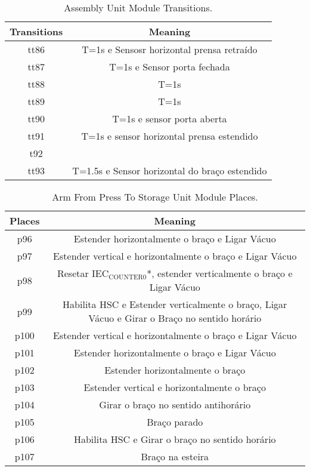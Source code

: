 \begin{table}[htbp]
\caption{Assembly Unit Module Transitions.}
\centering
\begin{tabular}{cc}
Transitions & Meaning\\
\hline
tt86 & T=1s e Sensosr horizontal prensa retraído\\
tt87 & T=1s e Sensor porta fechada\\
tt88 & T=1s\\
tt89 & T=1s\\
tt90 & T=1s e sensor porta aberta\\
tt91 & T=1s e sensor horizontal prensa estendido\\
t92 & \\
tt93 & T=1.5s e Sensor horizontal do braço estendido\\
\end{tabular}
\end{table}
\begin{table}[htbp]
\caption{Arm From Press To Storage Unit Module Places.}
\centering
\begin{tabular}{cc}
Places & Meaning\\
\hline
p96 & Estender horizontalmente o braço e Ligar Vácuo\\
p97 & Estender vertical e horizontalmente o braço e Ligar Vácuo\\
p98 & Resetar IEC\(_{\text{COUNTER0}}\)*, estender verticalmente o braço e Ligar Vácuo\\
p99 & Habilita HSC e Estender verticalmente o braço, Ligar Vácuo e Girar o Braço no sentido horário\\
p100 & Estender vertical e horizontalmente o braço e Ligar Vácuo\\
p101 & Estender horizontalmente o braço e Ligar Vácuo\\
p102 & Estender horizontalmente o braço\\
p103 & Estender vertical e horizontalmente o braço\\
p104 & Girar o braço no sentido antihorário\\
p105 & Braço parado\\
p106 & Habilita HSC e Girar o braço no sentido horário\\
p107 & Braço na esteira\\
\end{tabular}
\end{table}

